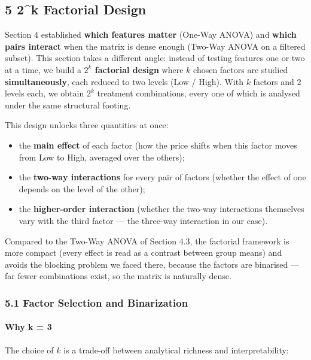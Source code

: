 \subsection{5 2\^{}k Factorial Design}\label{k-factorial-design}

Section 4 established \textbf{which features matter} (One-Way ANOVA) and
\textbf{which pairs interact} when the matrix is dense enough (Two-Way
ANOVA on a filtered subset). This section takes a different angle:
instead of testing features one or two at a time, we build a
\textbf{\(2^k\) factorial design} where \(k\) chosen factors are studied
\textbf{simultaneously}, each reduced to two levels (Low / High). With
\(k\) factors and 2 levels each, we obtain \(2^k\) treatment
combinations, every one of which is analysed under the same structural
footing.

This design unlocks three quantities at once:

\begin{itemize}
\tightlist
\item
  the \textbf{main effect} of each factor (how the price shifts when
  this factor moves from Low to High, averaged over the others);
\item
  the \textbf{two-way interactions} for every pair of factors (whether
  the effect of one depends on the level of the other);
\item
  the \textbf{higher-order interaction} (whether the two-way
  interactions themselves vary with the third factor --- the three-way
  interaction in our case).
\end{itemize}

Compared to the Two-Way ANOVA of Section 4.3, the factorial framework is
more compact (every effect is read as a contrast between group means)
and avoids the blocking problem we faced there, because the factors are
binarised --- far fewer combinations exist, so the matrix is naturally
dense.

\subsubsection{5.1 Factor Selection and
Binarization}\label{factor-selection-and-binarization}

\paragraph{Why k = 3}\label{why-k-3}

The choice of \(k\) is a trade-off between analytical richness and
interpretability:


